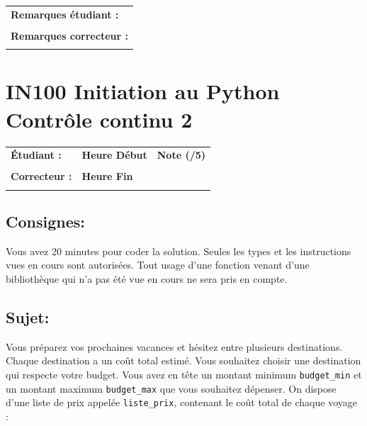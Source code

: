 \documentclass[a4paper,11pt]{article}
\begin{document}
\vspace*{-0.2 cm}

\begin{table}[h!]
\centering
\renewcommand{\arraystretch}{1.4} %
\begin{tabular}{|p{15cm}|}
\hline
\textbf{Remarques étudiant :}    \\
 \\
\hline
\textbf{Remarques correcteur :}  \\
 \\
\hline
\end{tabular}
\end{table}

\newpage

\section*{\center IN100 Initiation au Python\\
Contrôle continu 2}


\begin{table}[h!]
\centering
\renewcommand{\arraystretch}{1.4} %
\begin{tabular}{|p{10cm}|p{3cm}|p{2cm}|}
\hline
\textbf{Étudiant :} & \textbf{Heure Début }  & \textbf{Note (/5) }  \\
& & \\
\hline
\textbf{Correcteur :} & \textbf{Heure Fin } & \\
& & \\
\hline

\hline
\end{tabular}
\end{table}
\vspace{-0.6 cm}
\subsection*{Consignes:} Vous avez 20 minutes pour coder la solution. Seules les types et les instructions vues en cours sont autorisées. Tout usage d'une fonction 
venant d'une bibliothèque qui n'a pas été vue en cours ne sera pris en compte. 

\subsection*{Sujet:}


Vous préparez vos prochaines vacances et hésitez entre plusieurs destinations.
Chaque destination a un coût total estimé. Vous souhaitez choisir une destination qui respecte votre budget.
Vous avez en tête un montant minimum \texttt{budget\_min} et un montant maximum \texttt{budget\_max} que vous souhaitez dépenser.
On dispose d’une liste de prix appelée \texttt{liste\_prix}, contenant le coût total de chaque voyage :
\end{document}
